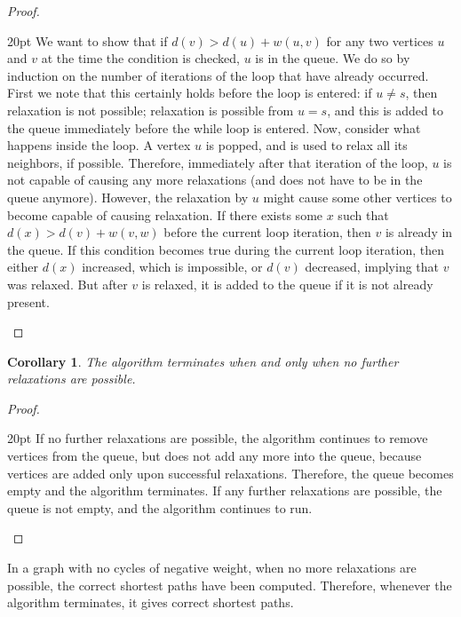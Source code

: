 \documentclass[a4paper, margin=15in]{article}
\newenvironment{myenv}{\begin{adjustwidth}{20pt}{}}{\end{adjustwidth}}
\newtheorem{corollary}{Corollary}
\begin{document}
\begin{proof}
\cite{Shortest73:online}
\begin{myenv}
We want to show that if $d(v) > d(u) + w(u,v)$ for any two vertices $u$ and $v$ at the time the condition is checked, $u$ is in the queue. We do so by induction on the number of iterations of the loop that have already occurred. First we note that this certainly holds before the loop is entered: if $u \neq s$, then relaxation is not possible; relaxation is possible from $u = s$, and this is added to the queue immediately before the while loop is entered. Now, consider what happens inside the loop. A vertex $u$ is popped, and is used to relax all its neighbors, if possible. Therefore, immediately after that iteration of the loop, $u$ is not capable of causing any more relaxations (and does not have to be in the queue anymore). However, the relaxation by $u$ might cause some other vertices to become capable of causing relaxation. If there exists some $x$ such that $d(x) > d(v)+ w(v,w)$ before the current loop iteration, then $v$ is already in the queue. If this condition becomes true during the current loop iteration, then either $d(x)$ increased, which is impossible, or $d(v)$ decreased, implying that $v$ was relaxed. But after $v$ is relaxed, it is added to the queue if it is not already present.
\end{myenv}
\end{proof}

\begin{corollary}
The algorithm terminates when and only when no further relaxations are possible.
\end{corollary}

\begin{proof}
\cite{Shortest73:online}
\begin{myenv}
If no further relaxations are possible, the algorithm continues to remove vertices from the queue, but does not add any more into the queue, because vertices are added only upon successful relaxations. Therefore, the queue becomes empty and the algorithm terminates. If any further relaxations are possible, the queue is not empty, and the algorithm continues to run.
\end{myenv}
\end{proof} In a graph with no cycles of negative weight, when no more relaxations are possible, the correct shortest paths have been computed\cite{Shortest64:online}. Therefore, whenever the algorithm terminates, it gives correct shortest paths.
\end{document}
